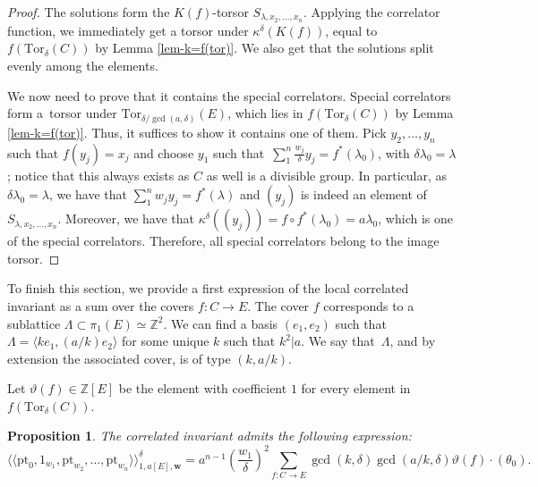 \documentclass[11pt]{article}
\numberwithin{equation}{section}
\newcommand{\Tor}{\mathrm{Tor}}
\newcommand{\pt}{\mathrm{pt}}
\newcommand{\ZZ}{\mathbb{Z}}
\newcommand{\bfw}{ {\boldsymbol w} }
\numberwithin{equation}{section}
\newtheorem{prop}[theo]{Proposition}
\theoremstyle{definition}
\begin{document}
\begin{proof}
 The solutions form the $K(f)$-torsor $S_{\lambda,x_2,\dots,x_n}$. Applying the correlator function, we immediately get a torsor under $\kappa^\delta(K(f))$, equal to $f(\Tor_\delta(C))$ by Lemma \ref{lem-k=f(tor)}. We also get that the solutions split evenly among the elements.

 We now need to prove that it contains the special correlators. Special correlators form a~torsor under $\Tor_{\delta/\gcd(a,\delta)}(E)$, which lies in $f(\Tor_\delta(C))$ by Lemma \ref{lem-k=f(tor)}. Thus, it suffices to show it contains one of them.
 Pick $y_2,\dots,y_n$ such that $f(y_j)=x_j$ and choose $y_1$ such that~${\sum_1^n\frac{w_j}{\delta}y_j=f^*(\lambda_0)}$, with $\delta\lambda_0=\lambda$; notice that this always exists as $C$ as well is a divisible group. In particular, as $\delta\lambda_0=\lambda$, we have that $\sum_1^n w_jy_j=f^*(\lambda)$ and $(y_j)$ is indeed an element of $S_{\lambda,x_2,\dots,x_n}$. Moreover, we have that
$\kappa^\delta((y_j))=f\circ f^*(\lambda_0)=a\lambda_0$,
 which is one of the special correlators. Therefore, all special correlators belong to the image torsor.
\end{proof}

To finish this section, we provide a first expression of the local correlated invariant as a sum over the covers $f\colon C\to E$. The cover $f$ corresponds to a sublattice $\Lambda\subset\pi_1(E)\simeq\ZZ^2$. We can find a basis $(e_1,e_2)$ such that $\Lambda=\langle ke_1,(a/k)e_2\rangle$ for some unique $k$ such that $k^2|a$. We say that~$\Lambda$, and by extension the associated cover, is of type $(k,a/k)$.

Let $\vartheta(f)\in\ZZ[E]$ be the element with coefficient $1$ for every element in $f(\Tor_\delta(C))$.

\begin{prop}\label{prop-first-expression-local-correlated-inv}
 The correlated invariant admits the following expression:
 \[ \langle\langle\pt_0,1_{w_1},\pt_{w_2},\dots,\pt_{w_n} \rangle\rangle^\delta_{1,a[E],\bfw} = a^{n-1}\left(\frac{w_1}{\delta}\right)^2\sum_{f\colon C\to E} \gcd(k,\delta)\gcd(a/k,\delta) \vartheta(f)\cdot (\theta_0). \]
\end{prop}
\end{document}
